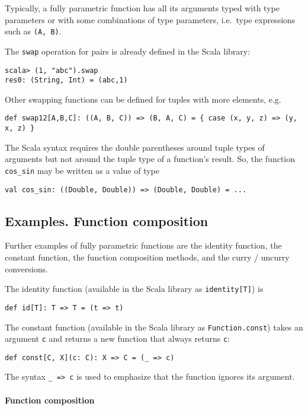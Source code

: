 Typically, a fully parametric function has all its arguments typed
with type parameters or with some combinations of type parameters,
i.e.~type expressions such as \lstinline!(A, B)!.

The \lstinline!swap! operation for pairs is already defined in the
Scala library:
\begin{lstlisting}
scala> (1, "abc").swap
res0: (String, Int) = (abc,1)
\end{lstlisting}
Other swapping functions can be defined for tuples with more elements,
e.g.
\begin{lstlisting}
def swap12[A,B,C]: ((A, B, C)) => (B, A, C) = { case (x, y, z) => (y, x, z) }
\end{lstlisting}
The Scala syntax requires the double parentheses around tuple types
of arguments but not around the tuple type of a function's result.
So, the function \lstinline!cos_sin! may be written as a value of
type
\begin{lstlisting}
val cos_sin: ((Double, Double)) => (Double, Double) = ...
\end{lstlisting}


\subsection{Examples. Function composition\label{subsec:Examples-of-fully-parametric}}

Further examples of fully parametric functions are the identity function,
the constant function, the function composition methods, and the curry
/ uncurry conversions. 

The identity function (available in the
Scala library as \lstinline!identity[T]!) is
\begin{lstlisting}
def id[T]: T => T = (t => t)
\end{lstlisting}
The constant function (available in the
Scala library as \lstinline!Function.const!) takes an argument \lstinline!c!
and returns a new function that always returns \lstinline!c!:
\begin{lstlisting}
def const[C, X](c: C): X => C = (_ => c)
\end{lstlisting}
The syntax \lstinline!_ => c! is used to emphasize that the function
ignores its argument.

\paragraph{Function composition}

